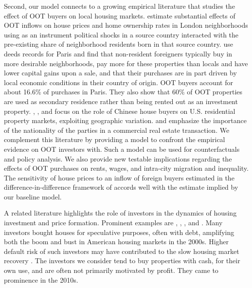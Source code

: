\documentclass[letterpaper,12pt,dvipsnames,usenames]{article}
\theoremstyle{definition}
\begin{document}
\begin{spacing}{1.25}
Second, our model connects to a growing empirical literature that studies the effect of OOT buyers on local housing markets. \citet{BR:16} estimate substantial effects of OOT inflows on house prices and home ownership rates in London neighborhoods using as an instrument political shocks in a source country interacted with the pre-existing share of neighborhood residents born in that source country. \citet{CS:16} use deeds records for Paris  and find that non-resident foreigners typically buy in more desirable neighborhoods, pay more for these properties than locals and have lower capital gains upon a sale, and that their purchases are in part driven by local economic conditions in their country of origin. OOT buyers account for about 16.6\% of purchases in Paris. They also show that 60\% of OOT  properties are used as secondary residence rather than being rented out as an investment property. \citet{LSZ:20}, \citet{BCW:20}, and \citet{GorbackKeys2020} focus on the role of Chinese house buyers on U.S. residential property markets, exploiting geographic variation. \citet{BRS:18} and \citet{ASW:18} emphasize the importance of the nationality of the parties in a commercial real estate transaction.  We complement this literature by providing a model to confront the empirical evidence on OOT investors with. Such a model can be used for counterfactuals and policy analysis. We also provide new testable implications regarding the effects of OOT purchases on rents, wages, and intra-city migration and inequality. The sensitivity of house prices to an inflow of foreign buyers estimated in the difference-in-difference framework of \citet{GorbackKeys2020} accords well with the estimate implied by our baseline model.

A related literature highlights the role of investors in the dynamics of housing investment and price formation. Prominent examples are  \citet{chincomayer:16}, \citet*{bayerspec:11}, \citet{GSX:20}, and \citet*{DFNZ:17}. Many investors bought houses for speculative purposes, often with debt, amplifying both the boom and bust in American housing markets in the 2000s. Higher default risk of such investors may have contributed to the slow housing market recovery \citep{piskseru:20}. The investors we consider tend to buy properties with cash, for their own use, and are often not primarily motivated by profit. They came to prominence in the 2010s.


\end{spacing}
\end{document}
